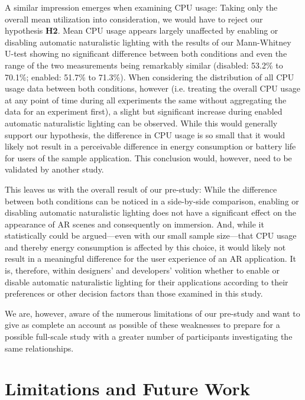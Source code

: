 \documentclass[12pt,twoside,english]{article}
\begin{document}
A similar impression emerges when examining \gls{CPU} usage:
Taking only the overall mean utilization into consideration, we would have to reject our hypothesis \textbf{H2}.
Mean \gls{CPU} usage appears largely unaffected by enabling or disabling automatic naturalistic lighting with the results of our Mann-Whitney U-test showing no significant difference between both conditions and even the range of the two measurements being remarkably similar (disabled: 53.2\% to 70.1\%; enabled: 51.7\% to 71.3\%).
When considering the distribution of all \gls{CPU} usage data between both conditions, however (i.e. treating the overall \gls{CPU} usage at any point of time during all experiments the same without aggregating the data for an experiment first), a slight but significant increase during enabled automatic naturalistic lighting can be observed.
While this would generally support our hypothesis, the difference in \gls{CPU} usage is so small that it would likely not result in a perceivable difference in energy consumption or battery life for users of the sample application.
This conclusion would, however, need to be validated by another study.

This leaves us with the overall result of our pre-study:
While the difference between both conditions can be noticed in a side-by-side comparison, enabling or disabling automatic naturalistic lighting does not have a significant effect on the appearance of \gls{AR} scenes and consequently on immersion.
And, while it statistically could be argued---even with our small sample size---that \gls{CPU} usage and thereby energy consumption is affected by this choice, it would likely not result in a meaningful difference for the user experience of an \gls{AR} application.
It is, therefore, within designers' and developers' volition whether to enable or disable automatic naturalistic lighting for their applications according to their preferences or other decision factors than those examined in this study.

We are, however, aware of the numerous limitations of our pre-study and want to give as complete an account as possible of these weaknesses to prepare for a possible full-scale study with a greater number of participants investigating the same relationships.

\section{Limitations and Future Work}
\label{sect:limitations}
\end{document}
